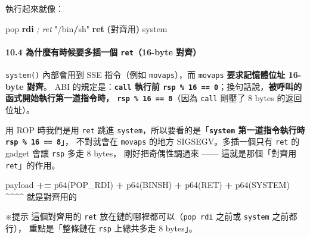 \documentclass[10pt,a4paper]{article}
\newenvironment{Shaded}{\begin{snugshade}}{\end{snugshade}}
\newcommand{\BuiltInTok}[1]{#1}
\newcommand{\CommentTok}[1]{\textcolor[rgb]{0.56,0.35,0.01}{\textit{#1}}}
\newcommand{\ControlFlowTok}[1]{\textcolor[rgb]{0.13,0.29,0.53}{\textbf{#1}}}
\newcommand{\KeywordTok}[1]{\textcolor[rgb]{0.13,0.29,0.53}{\textbf{#1}}}
\newcommand{\NormalTok}[1]{#1}
\newcommand{\OperatorTok}[1]{\textcolor[rgb]{0.81,0.36,0.00}{\textbf{#1}}}
\newcommand{\StringTok}[1]{\textcolor[rgb]{0.31,0.60,0.02}{#1}}
\renewenvironment{Shaded}{%
  \def\FrameCommand{\fboxsep=3.2pt\colorbox{shadecolor}}%
  \MakeFramed{\advance\hsize-\width\FrameRestore\small}%
}{%
  \endMakeFramed
}
\renewenvironment{quote}{%
  \begin{mdframed}[linewidth=0pt,innerleftmargin=0pt,innerrightmargin=0pt,
    innerbottommargin=0pt,innertopmargin=0pt,skipabove=0.55em,skipbelow=0.55em,
    leftmargin=0.9em,rightmargin=0.4em,startcode={\color{quotebar}\vrule width 2.6pt},%
    endcode={}]%
  \itshape\color{black}%
}{%
  \end{mdframed}%
}
\begin{document}
執行起來就像：

\begin{Shaded}
\begin{Highlighting}[]
\BuiltInTok{pop} \KeywordTok{rdi} \CommentTok{; ret}
\NormalTok{"/bin}\OperatorTok{/}\NormalTok{sh}\StringTok{"}
\ControlFlowTok{ret}            \OperatorTok{(}\NormalTok{對齊用}\OperatorTok{)}
\NormalTok{system}
\end{Highlighting}
\end{Shaded}

\paragraph{\texorpdfstring{10.4 為什麼有時候要多插一個
\texttt{ret}（16-byte
對齊）}{10.4 為什麼有時候要多插一個 ret（16-byte 對齊）}}\label{ux70baux4ec0ux9ebcux6709ux6642ux5019ux8981ux591aux63d2ux4e00ux500b-ret16-byte-ux5c0dux9f4a}

\texttt{system()} 內部會用到 SSE 指令（例如 \texttt{movaps}），而
\texttt{movaps} \textbf{要求記憶體位址 16-byte 對齊}。 ABI
的規定是：\textbf{\texttt{call} 執行前
\texttt{rsp\ \allowbreak{}\%\allowbreak{}\ \allowbreak{}16\ \allowbreak{}==\ \allowbreak{}0}}；換句話說，\textbf{被呼叫的函式開始執行第一道指令時，
\texttt{rsp\ \allowbreak{}\%\allowbreak{}\ \allowbreak{}16\ \allowbreak{}==\ \allowbreak{}8}}（因為 \texttt{call} 剛壓了 8 bytes
的返回位址）。

用 ROP 時我們是用 \texttt{ret} 跳進
\texttt{system}，所以要看的是「\textbf{\texttt{system} 第一道指令執行時
\texttt{rsp\ \allowbreak{}\%\allowbreak{}\ \allowbreak{}16\ \allowbreak{}==\ \allowbreak{}8}}」， 不對就會在 \texttt{movaps} 的地方
SIGSEGV。多插一個只有 \texttt{ret} 的 gadget 會讓 \texttt{rsp} 多走 8
bytes， 剛好把奇偶性調過來 ------ 這就是那個「對齊用
\texttt{ret}」的作用。

\begin{Shaded}
\begin{Highlighting}[]
\NormalTok{payload }\OperatorTok{+=}\NormalTok{ p64(POP\_RDI) }\OperatorTok{+}\NormalTok{ p64(BINSH) }\OperatorTok{+}\NormalTok{ p64(RET) }\OperatorTok{+}\NormalTok{ p64(SYSTEM)}
                                                  \OperatorTok{\^{}\^{}\^{}\^{}}\NormalTok{ 就是對齊用的}
\end{Highlighting}
\end{Shaded}

\begin{quote}
※提示 這個對齊用的 \texttt{ret} 放在鏈的哪裡都可以（\texttt{pop\ \allowbreak{}rdi}
之前或 \texttt{system} 之前都行）， 重點是「整條鏈在 \texttt{rsp}
上總共多走 8 bytes」。
\end{quote}
\end{document}
